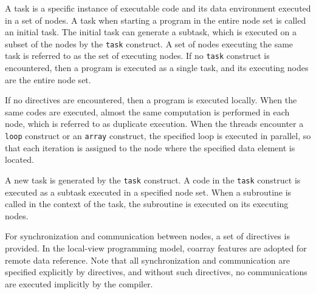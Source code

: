 A task is a specific instance of executable
code and its data environment executed in a set of nodes. A task when
starting a program in the entire node set is called an initial task. The
initial task can generate a subtask, which is executed on a subset of the
nodes by the {\tt task} construct. A set of nodes executing the same task is
referred to as the set of executing nodes. If no {\tt task} construct is encountered, then a
program is executed as a single task, and its executing nodes are the entire node set.

If no directives are encountered, then a program is executed
locally. When the same codes are executed, almost the same computation is
performed in each node, which is referred to as duplicate execution. When the threads
encounter a {\tt loop} construct or an {\tt array} construct, the specified
loop is executed in parallel, so that each iteration is assigned to the
node where the specified data element is located. 

A new task is generated by
the {\tt task} construct. A code in the {\tt task} construct is executed
as a subtask executed in a specified node set. When a subroutine is
called in the context of the task, the subroutine is executed on its
executing nodes. 

For synchronization and communication between nodes, a set of
directives is provided. In the local-view programming model, coarray
features are adopted for remote data reference. Note 
that all synchronization and communication are specified explicitly by directives, and without such directives, no communications are
executed implicitly by the compiler.
